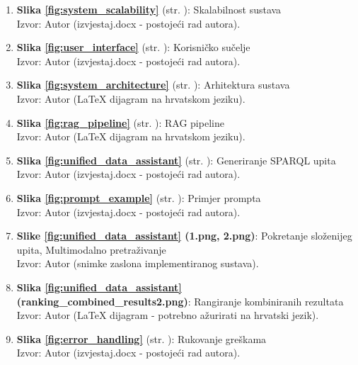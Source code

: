 \begin{enumerate}
\item \textbf{Slika \ref{fig:system_scalability}} (str. \pageref{fig:system_scalability}): Skalabilnost sustava \\
Izvor: Autor (izvjestaj.docx - postojeći rad autora).

\item \textbf{Slika \ref{fig:user_interface}} (str. \pageref{fig:user_interface}): Korisničko sučelje \\
Izvor: Autor (izvjestaj.docx - postojeći rad autora).

\item \textbf{Slika \ref{fig:system_architecture}} (str. \pageref{fig:system_architecture}): Arhitektura sustava \\
Izvor: Autor (LaTeX dijagram na hrvatskom jeziku).

\item \textbf{Slika \ref{fig:rag_pipeline}} (str. \pageref{fig:rag_pipeline}): RAG pipeline \\
Izvor: Autor (LaTeX dijagram na hrvatskom jeziku).

\item \textbf{Slika \ref{fig:unified_data_assistant}} (str. \pageref{fig:unified_data_assistant}): Generiranje SPARQL upita \\
Izvor: Autor (izvjestaj.docx - postojeći rad autora).

\item \textbf{Slika \ref{fig:prompt_example}} (str. \pageref{fig:prompt_example}): Primjer prompta \\
Izvor: Autor (izvjestaj.docx - postojeći rad autora).

\item \textbf{Slike \ref{fig:unified_data_assistant} (1.png, 2.png)}: Pokretanje složenijeg upita, Multimodalno pretraživanje \\
Izvor: Autor (snimke zaslona implementiranog sustava).

\item \textbf{Slika \ref{fig:unified_data_assistant} (ranking\_combined\_results2.png)}: Rangiranje kombiniranih rezultata \\
Izvor: Autor (LaTeX dijagram - potrebno ažurirati na hrvatski jezik).

\item \textbf{Slika \ref{fig:error_handling}} (str. \pageref{fig:error_handling}): Rukovanje greškama \\
Izvor: Autor (izvjestaj.docx - postojeći rad autora).


\end{enumerate}
